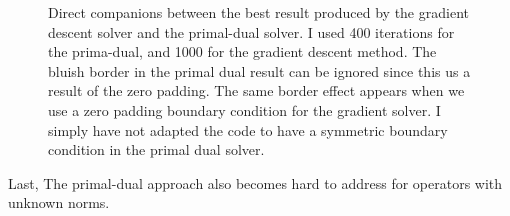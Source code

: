 \documentclass{paper}
\begin{document}
\begin{figure}[H]
\begin{center}
\end{center}
\caption{Direct companions between the best result produced by the gradient descent solver and the primal-dual solver. I used 400 iterations for the prima-dual, and 1000 for the gradient descent method. The bluish border in the primal dual result can be ignored since this us a result of the zero padding. The same border effect appears when we use a zero padding boundary condition for the gradient solver. I simply have not adapted the code to have a symmetric boundary condition in the primal dual solver.}
\label{fig:best_comp}
\end{figure}

Last, The primal-dual approach also becomes hard to address for operators with unknown norms.
\end{document}
